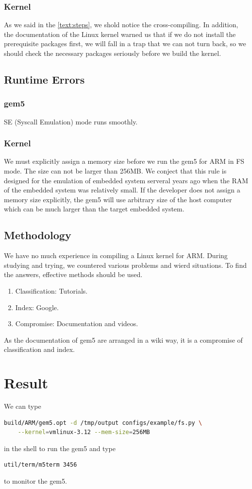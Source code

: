 \documentclass[utf8,a4paper]{article}
\begin{document}
		\subsubsection{Kernel}
			As we said in the \autoref{text:steps}, we shold notice the cross-compiling.  In addition, the documentation of the Linux kernel warned us that if we do not install the prerequisite packages first, we will fall in a trap that we can not turn back, so we should check the necessary packages seriously before we build the kernel.

	\subsection{Runtime Errors}
		\subsubsection{gem5}
				SE (Syscall Emulation) mode runs smoothly.
		\subsubsection{Kernel}
	We must explicitly assign a memory size before we run the gem5 for ARM in FS mode. The size can not be larger than 256MB. We conject that this rule is designed for the emulation of embedded system serveral years ago when the RAM of the embedded system was relatively small. If the developer does not assign a memory size explicitly, the gem5 will use arbitrary size of the host computer which can be much larger than the target embedded system. 


\subsection{Methodology}
We have no much experience in compiling a Linux kernel for ARM. During studying and trying, we countered various problems and wierd situations. To find the answers, effective methods should be used.
	\begin{enumerate}
		\item
		Classification: Tutorials.
		\item
		Index: Google.
		\item
		Compromise: Documentation and videos.
	\end{enumerate}
As the documentation of gem5 are arranged in a wiki way, it is a compromise of classification and index.
\section{Result}
We can type
\begin{lstlisting}[language=bash, frame=shadowbox]
build/ARM/gem5.opt -d /tmp/output configs/example/fs.py \
	--kernel=vmlinux-3.12 --mem-size=256MB
\end{lstlisting}
in  the shell to run the gem5 and type
\begin{lstlisting}[language=bash, frame=shadowbox]
util/term/m5term 3456
\end{lstlisting}
to monitor the gem5.
\end{document}
